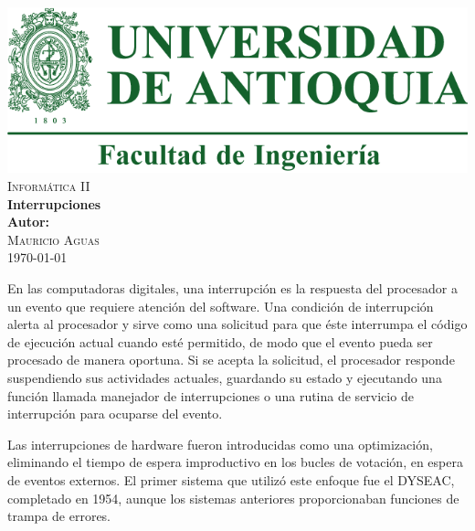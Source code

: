 \documentclass{article}
\begin{document}
\begin{titlepage}


\center %

\includegraphics[scale=0.5]{Udea.png}\\[2cm] 

\textsc{\Large Informática II}\\[2cm] 

{ \huge \bfseries Interrupciones}\\[3cm]

\textbf{Autor:}\\ 
\textsc{Mauricio Aguas}\\[4cm] 


{\large \today}\\[2cm]

\vfill 

\end{titlepage}

\newpage
En las computadoras digitales, una interrupción es la respuesta del procesador a un evento que requiere atención del software. Una condición de interrupción alerta al procesador y sirve como una solicitud para que éste interrumpa el código de ejecución actual cuando esté permitido, de modo que el evento pueda ser procesado de manera oportuna. Si se acepta la solicitud, el procesador responde suspendiendo sus actividades actuales, guardando su estado y ejecutando una función llamada manejador de interrupciones o una rutina de servicio de interrupción para ocuparse del evento.


\vspace{4mm}

Las interrupciones de hardware fueron introducidas como una optimización, eliminando el tiempo de espera improductivo en los bucles de votación, en espera de eventos externos. El primer sistema que utilizó este enfoque fue el DYSEAC, completado en 1954, aunque los sistemas anteriores proporcionaban funciones de trampa de errores.
\end{document}
